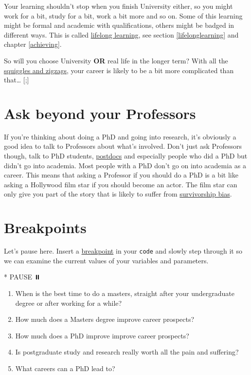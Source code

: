 \documentclass[
]{book}
\newenvironment{Shaded}{\begin{snugshade}}{\end{snugshade}}
\newcommand{\NormalTok}[1]{#1}
\newcommand{\SpecialStringTok}[1]{\textcolor[rgb]{0.31,0.60,0.02}{#1}}
\providecommand{\tightlist}{%
  \setlength{\itemsep}{0pt}\setlength{\parskip}{0pt}}
\begin{document}
Your learning shouldn't stop when you finish University either, so you might work for a bit, study for a bit, work a bit more and so on. Some of this learning might be formal and academic with qualifications, others might be badged in different ways. This is called \href{https://en.wikipedia.org/wiki/Lifelong_learning}{lifelong learning}, see section \ref{lifelonglearning} and chapter \ref{achieving}.

So will you choose University \textbf{OR} real life in the longer term? With all the \href{https://www.amazingif.com/listen/}{squiggles and zigzags}, your career is likely to be a bit more complicated than that\ldots{} {[}\citet{squigglybook};{]}

\hypertarget{prof}{%
\section{Ask beyond your Professors}\label{prof}}

If you're thinking about doing a PhD and going into research, it's obviously a good idea to talk to Professors about what's involved. Don't just ask Professors though, talk to PhD students, \href{https://en.wikipedia.org/wiki/Postdoctoral_researcher}{postdocs} and especially people who did a PhD but didn't go into academia. Most people with a PhD don't go on into academia as a career. \citep{postdochell} This means that asking a Professor if you should do a PhD is a bit like asking a Hollywood film star if you should become an actor. The film star can only give you part of the story that is likely to suffer from \href{https://en.wikipedia.org/wiki/Survivorship_bias}{survivorship bias}. \citep{therock}

\hypertarget{rbreakpoints}{%
\section{Breakpoints}\label{rbreakpoints}}

Let's pause here. Insert a \href{https://en.wikipedia.org/wiki/Breakpoint}{breakpoint} in your \texttt{code} and slowly step through it so we can examine the current values of your variables and parameters.

\begin{Shaded}
\begin{Highlighting}[]
\SpecialStringTok{* }\NormalTok{PAUSE ⏸️}
\end{Highlighting}
\end{Shaded}

\begin{enumerate}
\def\labelenumi{\arabic{enumi}.}
\tightlist
\item
  When is the best time to do a masters, straight after your undergraduate degree or after working for a while?
\item
  How much does a Masters degree improve career prospects?
\item
  How much does a PhD improve improve career prospects?
\item
  Is postgraduate study and research really worth all the pain and suffering?
\item
  What careers can a PhD lead to?
\end{enumerate}
\end{document}

